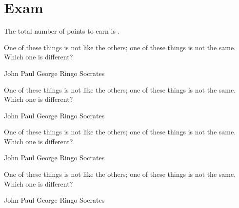\documentclass[a4paper,answers,addpoints]{exam}
\begin{document}
\section*{Exam}
The total number of points to earn is \numpoints.

\hrulefill


\begin{questions}




\question[5]
One of these things is not like the others; one of these
things is not the same. Which one is different?

\begin{randomizechoices}
\choice John
\choice Paul
\choice George
\choice Ringo
\CorrectChoice Socrates
\end{randomizechoices}

\question[5]
One of these things is not like the others; one of these
things is not the same. Which one is different?

\begin{randomizeoneparchoices}
\choice John
\choice Paul
\choice George
\choice Ringo
\CorrectChoice Socrates
\end{randomizeoneparchoices}

\question[5]
One of these things is not like the others; one of these
things is not the same. Which one is different?

\begin{randomizecheckboxes}
\choice John
\choice Paul
\choice George
\choice Ringo
\CorrectChoice Socrates
\end{randomizecheckboxes}

\question[5]
One of these things is not like the others; one of these
things is not the same. Which one is different?

\begin{randomizeoneparcheckboxes}
\choice John
\choice Paul
\choice George
\choice Ringo
\CorrectChoice Socrates
\end{randomizeoneparcheckboxes}


\end{questions}
\end{document}
